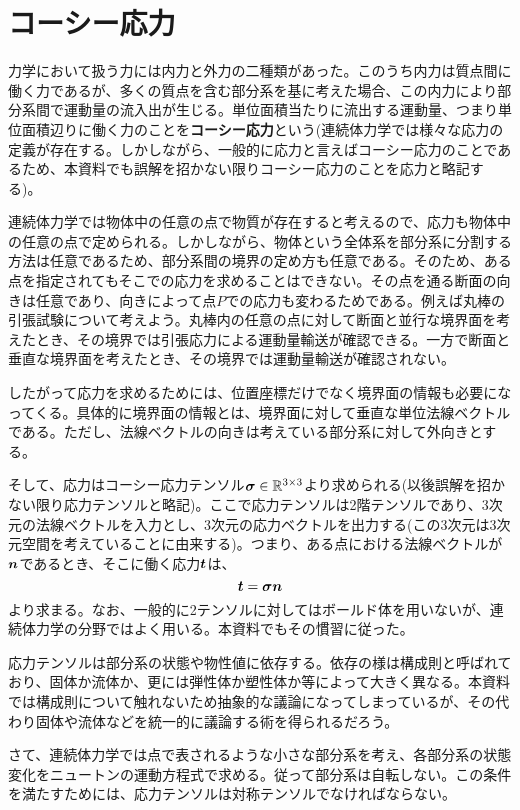 \documentclass[dvipdfmx, 9pt, a4paper]{jsarticle}
\numberwithin{equation}{section}
\newcommand{\bm}[1]{{\mbox{\boldmath $#1$}}}
\begin{document}
\section{コーシー応力}
力学において扱う力には内力と外力の二種類があった。このうち内力は質点間に働く力であるが、多くの質点を含む部分系を基に考えた場合、この内力により部分系間で運動量の流入出が生じる。単位面積当たりに流出する運動量、つまり単位面積辺りに働く力のことを{\bf コーシー応力}という(連続体力学では様々な応力の定義が存在する。しかしながら、一般的に応力と言えばコーシー応力のことであるため、本資料でも誤解を招かない限りコーシー応力のことを応力と略記する)。\par
連続体力学では物体中の任意の点で物質が存在すると考えるので、応力も物体中の任意の点で定められる。しかしながら、物体という全体系を部分系に分割する方法は任意であるため、部分系間の境界の定め方も任意である。そのため、ある点を指定されてもそこでの応力を求めることはできない。その点を通る断面の向きは任意であり、向きによって点$P$での応力も変わるためである。例えば丸棒の引張試験について考えよう。丸棒内の任意の点に対して断面と並行な境界面を考えたとき、その境界では引張応力による運動量輸送が確認できる。一方で断面と垂直な境界面を考えたとき、その境界では運動量輸送が確認されない。\par
したがって応力を求めるためには、位置座標だけでなく境界面の情報も必要になってくる。具体的に境界面の情報とは、境界面に対して垂直な単位法線ベクトルである。ただし、法線ベクトルの向きは考えている部分系に対して外向きとする。\par
そして、応力はコーシー応力テンソル$\bm \sigma \in \mathbb{R}^{3 \times 3}$より求められる(以後誤解を招かない限り応力テンソルと略記)。ここで応力テンソルは2階テンソルであり、3次元の法線ベクトルを入力とし、3次元の応力ベクトルを出力する(この3次元は3次元空間を考えていることに由来する)。つまり、ある点における法線ベクトルが$\bm n$であるとき、そこに働く応力$\bm t$は、
\begin{equation}
\bm t=\bm \sigma \bm n
\end{equation}
より求まる。なお、一般的に2テンソルに対してはボールド体を用いないが、連続体力学の分野ではよく用いる。本資料でもその慣習に従った。\par
応力テンソルは部分系の状態や物性値に依存する。依存の様は構成則と呼ばれており、固体か流体か、更には弾性体か塑性体か等によって大きく異なる。本資料では構成則について触れないため抽象的な議論になってしまっているが、その代わり固体や流体などを統一的に議論する術を得られるだろう。\par
さて、連続体力学では点で表されるような小さな部分系を考え、各部分系の状態変化をニュートンの運動方程式で求める。従って部分系は自転しない。この条件を満たすためには、応力テンソルは対称テンソルでなければならない。\par
\end{document}
